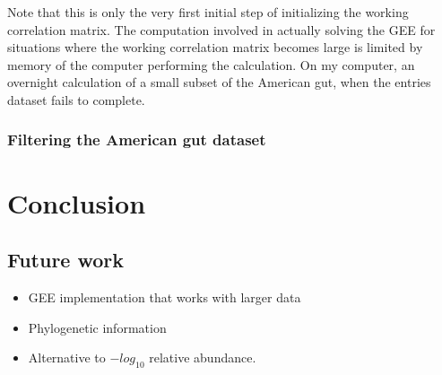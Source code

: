 \documentclass[12pt]{article}
\begin{document}
Note that this is only the very first initial step of initializing the working correlation matrix. The computation involved in actually solving the GEE for situations where the working correlation matrix becomes large is limited by memory of the computer performing the calculation. On my computer, an overnight calculation of a small subset of the American gut, when the entries dataset fails to complete.



\subsubsection{Filtering the American gut dataset}


\section{Conclusion}

\subsection{Future work}
\begin{itemize}
  \item GEE implementation that works with larger data
  \item Phylogenetic information
  \item Alternative to $-log_{10}$ relative abundance.
\end{itemize}





\begin{singlespace}
\printbibliography
\end{singlespace}
\end{document}
